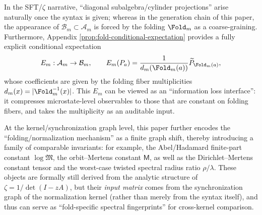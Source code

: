 \begin{remark}\label{rem:fold-new-invariants}
In the SFT/\(\zeta\) narrative, ``diagonal subalgebra/cylinder projections'' arise naturally once the syntax is given; whereas in the generation chain of this paper, the appearance of \(\mathcal{B}_m\subset\mathcal{A}_m\) is forced by the folding \(\Fold_m\) as a coarse-graining. Furthermore, Appendix \ref{prop:fold-conditional-expectation} provides a fully explicit conditional expectation
\[
E_m:\mathcal{A}_m\to\mathcal{B}_m,\qquad
E_m(P_a)=\frac{1}{d_m(\Fold_m(a))}\widetilde P_{\Fold_m(a)},
\]
whose coefficients are given by the folding fiber multiplicities \(d_m(x)=|\Fold_m^{-1}(x)|\). This \(E_m\) can be viewed as an ``information loss interface'': it compresses microstate-level observables to those that are constant on folding fibers, and takes the multiplicity as an auditable input.

At the kernel/synchronization graph level, this paper further encodes the ``folding/normalization mechanism'' as a finite graph shift, thereby introducing a family of comparable invariants: for example, the Abel/Hadamard finite-part constant \(\log\mathfrak{M}\), the orbit--Mertens constant \(\mathsf{M}\), as well as the Dirichlet--Mertens constant tensor and the worst-case twisted spectral radius ratio \(\rho/\lambda\). These objects are formally still derived from the analytic structure of \(\zeta=1/\det(I-zA)\), but their \emph{input matrix} comes from the synchronization graph of the normalization kernel (rather than merely from the syntax itself), and thus can serve as ``fold-specific spectral fingerprints'' for cross-kernel comparison.
\end{remark}
